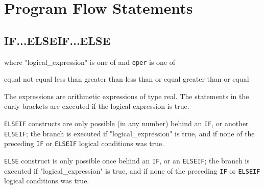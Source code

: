 
\chapter{Program Flow Statements}

 




\section{IF...ELSEIF...ELSE}
\label{sec:if}


where "logical\_expression" is one of 
and {\tt oper} is one of 
\begin{madlist}
\ttitem{==}  equal
\ttitem{<>}  not equal
\ttitem{<}  less than
\ttitem{>}  greater than
\ttitem{<=}  less than or equal
\ttitem{>=}  greater than or equal
\end{madlist}

The expressions are arithmetic expressions of type real. The statements
in the curly brackets are executed if the logical expression is true.  

{\tt ELSEIF} constructs are only possible (in any number) behind an
{\tt IF}, or another {\tt ELSEIF}; the branch is executed if
"logical\_expression" is true, and if none of the preceding {\tt IF}
or {\tt ELSEIF} logical conditions was true.   


{\tt ELSE} construct is only possible once behind an {\tt IF}, or
an {\tt ELSEIF}; the branch is executed if "logical\_expression" is
true, and if none of the preceding {\tt IF} or {\tt ELSEIF}
logical conditions was true.   

